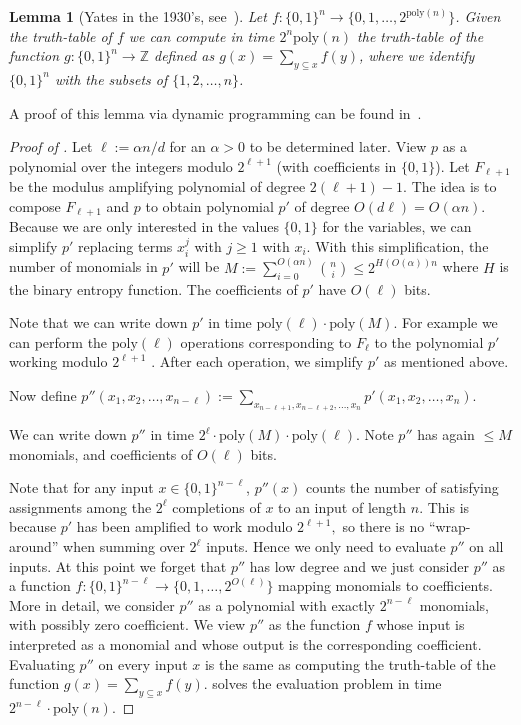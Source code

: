 \documentclass{toc}
\newtheorem{lem}[theorem]{Lemma}  %
\newcommand{\zo}{\{0, 1\}}
\newcommand{\poly}{\mathrm{poly}}
\begin{document}
%
\begin{lem}[{Yates in the 1930's, see~\cite{Williams14-acc-jacm}}] %
%
\label{lem:Yates}
Let $f:\zo^{n}\to\{0,1,\ldots,2^{\poly(n)}\}$. Given the truth-table
of $f$ we can compute in time $2^{n}\poly(n)$ the truth-table of
the function $g:\zo^{n}\to\mathbb{Z}$ defined as $g(x)=\sum_{y\subseteq x}f(y)$,
where we identify $\zo^{n}$ with the subsets of $\{1,2,\ldots,n\}$.
\end{lem}

A proof of this lemma via dynamic programming can be found in~\cite{Williams14-acc-jacm}.
\begin{proof}[Proof of ] Let $\ell:=\alpha n/d$
for an $\alpha>0$ to be determined later. View $p$ as a polynomial
over the integers modulo $2^{\ell+1}$ (with coefficients in $\zo$).
Let $F_{\ell+1}$ be the modulus amplifying polynomial of degree $2(\ell+1)-1$.
The idea is to compose $F_{\ell+1}$ and $p$ to obtain polynomial
$p'$ of degree $O(d\ell)=O(\alpha n)$. Because we are only interested
in the values $\zo$ for the variables, we can simplify $p'$ replacing
terms $x_{i}^{j}$ with $j\ge1$ with $x_{i}$. With this simplification,
the number of monomials in $p'$ will be $M:=\sum_{i=0}^{O(\alpha n)}\binom{n}{i}\le2^{H(O(\alpha))n}$
where $H$ is the binary entropy function. The coefficients of $p'$
have $O(\ell)$ bits.

Note that we can write down $p'$ in time $\poly(\ell)\cdot\poly(M)$.
For example we can perform the $\poly(\ell)$ operations corresponding
to $F_{\ell}$ to the polynomial $p'$ working modulo $2^{\ell+1}$
. After each operation, we simplify $p'$ as mentioned above.

Now define $p''(x_{1},x_{2},\ldots,x_{n-\ell}):=\sum_{x_{n-\ell+1},x_{n-\ell+2},\ldots,x_{n}}p'(x_{1},x_{2},\ldots,x_{n})$.

We can write down $p''$ in time $2^{\ell}\cdot\poly(M)\cdot\poly(\ell)$.
Note $p''$ has again $\le M$ monomials, and coefficients of $O(\ell)$
bits.

Note that for any input $x\in\zo^{n-\ell}$, $p''(x)$ counts the
number of satisfying assignments among the $2^{\ell}$ completions
of $x$ to an input of length $n$. This is because $p'$ has been
amplified to work modulo $2^{\ell+1},$ so there is no ``wrap-around''
when summing over $2^{\ell}$ inputs. Hence we only need to evaluate
$p''$ on all inputs. At this point we forget that $p''$ has low
degree and we just consider $p''$ as a function $f:\zo^{n-\ell}\to\{0,1,\ldots,2^{O(\ell)}\}$
mapping monomials to coefficients. More in detail, we consider $p''$
as a polynomial with exactly $2^{n-\ell}$ monomials, with possibly
zero coefficient. We view $p''$ as the function $f$ whose input
is interpreted as a monomial and whose output is the corresponding
coefficient. Evaluating $p''$ on every input $x$ is the same as
computing the truth-table of the function $g(x)=\sum_{y\subseteq x}f(y)$.
 solves the evaluation problem in time $2^{n-\ell}\cdot\poly(n)$.


\end{proof}
\end{document}
